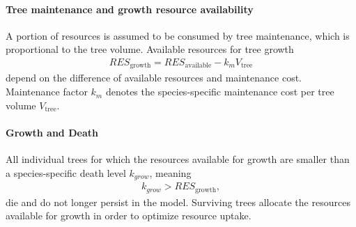 \documentclass[manusscript, 12p, authoryear]{elsarticle}
\begin{document}
\paragraph{\textbf{Tree maintenance and growth resource availability}}
A portion of resources is assumed to be consumed by tree maintenance, which is proportional to the tree volume.
Available resources for tree growth
\begin{align}
RES_{\text{growth}} = RES_{\text{available}} - k_m V_{\text{tree}}
\end{align}
depend on the difference of available resources and maintenance cost.
Maintenance factor $k_m$ denotes the species-specific maintenance cost per tree volume $V_{\text{tree}}$.
\paragraph{\textbf{Growth and Death}}
All individual trees for which the resources available for growth are smaller than a species-specific death level $k_{grow}$, meaning
\begin{align}
k_{grow} > RES_{\text{growth}},
\end{align}
die and do not longer persist in the model.
Surviving trees allocate the resources available for growth in order to optimize resource uptake.
\end{document}
